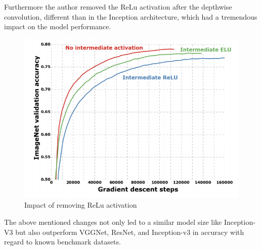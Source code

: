 Furthermore the author removed the ReLu activation after the depthwise convolution, different than in the Inception architecture, which had a tremendous impact on the model performance.
\begin{figure}
  \centering
  \includegraphics[width=\linewidth]{figures/xception_activation.png}
  \caption{Impact of removing ReLu activation}
  \label{xception_activation}
\end{figure}

The above mentioned changes not only led to a similar model size like Inception-V3 but also outperform  VGGNet, ResNet, and Inception-v3 in accuracy with regard to known benchmark datasets\cite{chollet2017xception}.



